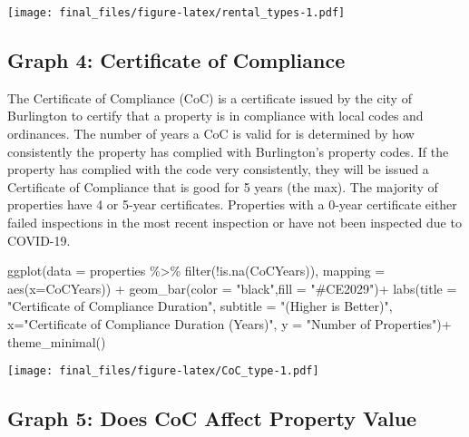 \documentclass[
]{article}
\newenvironment{Shaded}{\begin{snugshade}}{\end{snugshade}}
\newcommand{\AttributeTok}[1]{\textcolor[rgb]{0.77,0.63,0.00}{#1}}
\newcommand{\FunctionTok}[1]{\textcolor[rgb]{0.00,0.00,0.00}{#1}}
\newcommand{\NormalTok}[1]{#1}
\newcommand{\SpecialCharTok}[1]{\textcolor[rgb]{0.00,0.00,0.00}{#1}}
\newcommand{\StringTok}[1]{\textcolor[rgb]{0.31,0.60,0.02}{#1}}
\begin{document}
\texttt{[image: final\_files/figure-latex/rental\_types-1.pdf]}

\hypertarget{graph-4-certificate-of-compliance}{%
\subsection{Graph 4: Certificate of
Compliance}\label{graph-4-certificate-of-compliance}}

The Certificate of Compliance (CoC) is a certificate issued by the city
of Burlington to certify that a property is in compliance with local
codes and ordinances. The number of years a CoC is valid for is
determined by how consistently the property has complied with
Burlington's property codes. If the property has complied with the code
very consistently, they will be issued a Certificate of Compliance that
is good for 5 years (the max). The majority of properties have 4 or
5-year certificates. Properties with a 0-year certificate either failed
inspections in the most recent inspection or have not been inspected due
to COVID-19.

\begin{Shaded}
\begin{Highlighting}[]
\FunctionTok{ggplot}\NormalTok{(}\AttributeTok{data =}\NormalTok{ properties }\SpecialCharTok{\%\textgreater{}\%} \FunctionTok{filter}\NormalTok{(}\SpecialCharTok{!}\FunctionTok{is.na}\NormalTok{(CoCYears)), }\AttributeTok{mapping =} \FunctionTok{aes}\NormalTok{(}\AttributeTok{x=}\NormalTok{CoCYears)) }\SpecialCharTok{+} 
        \FunctionTok{geom\_bar}\NormalTok{(}\AttributeTok{color =} \StringTok{"black"}\NormalTok{,}\AttributeTok{fill =} \StringTok{"\#CE2029"}\NormalTok{)}\SpecialCharTok{+}
        \FunctionTok{labs}\NormalTok{(}\AttributeTok{title =} \StringTok{"Certificate of Compliance Duration"}\NormalTok{,}
             \AttributeTok{subtitle =} \StringTok{"(Higher is Better)"}\NormalTok{,}
             \AttributeTok{x=}\StringTok{"Certificate of Compliance Duration (Years)"}\NormalTok{, }
             \AttributeTok{y =} \StringTok{"Number of Properties"}\NormalTok{)}\SpecialCharTok{+}
        \FunctionTok{theme\_minimal}\NormalTok{()}
\end{Highlighting}
\end{Shaded}

\texttt{[image: final\_files/figure-latex/CoC\_type-1.pdf]}

\hypertarget{graph-5-does-coc-affect-property-value}{%
\subsection{Graph 5: Does CoC Affect Property
Value}\label{graph-5-does-coc-affect-property-value}}
\end{document}
